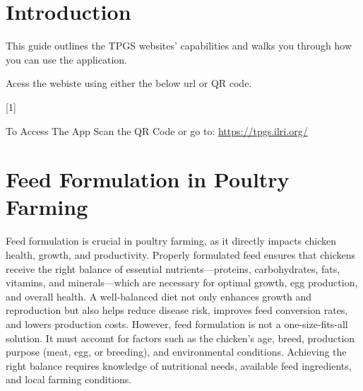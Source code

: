 \documentclass[a4paper,12pt]{article}
\begin{document}


\newpage
\section{Introduction}

This guide outlines the TPGS websites' capabilities and walks you through how you can use the application.

Acess the webiste using either the below url or QR code.


[1]
  {\par\medskip\noindent
  \par\medskip%
}

\begin{myremark}{To Access The App}\label{visite_site}
\vspace{10px}
Scan the QR Code or go to: \href{https://tpgs.ilri.org/}{https://tpgs.ilri.org/}

\vspace{20px}

\quad
{}
\end{myremark}

\newpage

\section{Feed Formulation in Poultry Farming}
Feed formulation is crucial in poultry farming, as it directly impacts chicken health,
growth, and productivity. Properly formulated feed ensures that chickens receive the
right balance of essential nutrients—proteins, carbohydrates, fats, vitamins, and
minerals—which are necessary for optimal growth, egg production, and overall health. A
well-balanced diet not only enhances growth and reproduction but also helps reduce
disease risk, improves feed conversion rates, and lowers production costs. However,
feed formulation is not a one-size-fits-all solution. It must account for factors such as the
chicken's age, breed, production purpose (meat, egg, or breeding), and environmental
conditions. Achieving the right balance requires knowledge of nutritional needs,
available feed ingredients, and local farming conditions.
\end{document}
